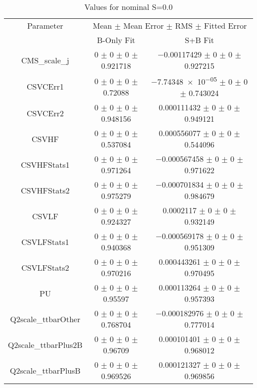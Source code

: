 \begin{table}
\centering
\caption{Values for nominal S=0.0}
\begin{tabular}{ccc}
\toprule
Parameter & \multicolumn{2}{c}{Mean $\pm$ Mean Error $\pm$ RMS $\pm$ Fitted Error}\\
 & B-Only Fit & S+B Fit\\
\midrule
CMS\_scale\_j & \num{0} $\pm$ \num{0} $\pm$ \num{0} $\pm$ \num{0.921718} & \num{-0.00117429} $\pm$ \num{0} $\pm$ \num{0} $\pm$ \num{0.927215}\\
CSVCErr1 & \num{0} $\pm$ \num{0} $\pm$ \num{0} $\pm$ \num{0.72088} & \num{-7.74348e-05} $\pm$ \num{0} $\pm$ \num{0} $\pm$ \num{0.743024}\\
CSVCErr2 & \num{0} $\pm$ \num{0} $\pm$ \num{0} $\pm$ \num{0.948156} & \num{0.000111432} $\pm$ \num{0} $\pm$ \num{0} $\pm$ \num{0.949121}\\
CSVHF & \num{0} $\pm$ \num{0} $\pm$ \num{0} $\pm$ \num{0.537084} & \num{0.000556077} $\pm$ \num{0} $\pm$ \num{0} $\pm$ \num{0.544096}\\
CSVHFStats1 & \num{0} $\pm$ \num{0} $\pm$ \num{0} $\pm$ \num{0.971264} & \num{-0.000567458} $\pm$ \num{0} $\pm$ \num{0} $\pm$ \num{0.971622}\\
CSVHFStats2 & \num{0} $\pm$ \num{0} $\pm$ \num{0} $\pm$ \num{0.975279} & \num{-0.000701834} $\pm$ \num{0} $\pm$ \num{0} $\pm$ \num{0.984679}\\
CSVLF & \num{0} $\pm$ \num{0} $\pm$ \num{0} $\pm$ \num{0.924327} & \num{0.0002117} $\pm$ \num{0} $\pm$ \num{0} $\pm$ \num{0.932149}\\
CSVLFStats1 & \num{0} $\pm$ \num{0} $\pm$ \num{0} $\pm$ \num{0.940368} & \num{-0.000569178} $\pm$ \num{0} $\pm$ \num{0} $\pm$ \num{0.951309}\\
CSVLFStats2 & \num{0} $\pm$ \num{0} $\pm$ \num{0} $\pm$ \num{0.970216} & \num{0.000443261} $\pm$ \num{0} $\pm$ \num{0} $\pm$ \num{0.970495}\\
PU & \num{0} $\pm$ \num{0} $\pm$ \num{0} $\pm$ \num{0.95597} & \num{0.000113264} $\pm$ \num{0} $\pm$ \num{0} $\pm$ \num{0.957393}\\
Q2scale\_ttbarOther & \num{0} $\pm$ \num{0} $\pm$ \num{0} $\pm$ \num{0.768704} & \num{-0.000182976} $\pm$ \num{0} $\pm$ \num{0} $\pm$ \num{0.777014}\\
Q2scale\_ttbarPlus2B & \num{0} $\pm$ \num{0} $\pm$ \num{0} $\pm$ \num{0.96709} & \num{0.000101401} $\pm$ \num{0} $\pm$ \num{0} $\pm$ \num{0.968012}\\
Q2scale\_ttbarPlusB & \num{0} $\pm$ \num{0} $\pm$ \num{0} $\pm$ \num{0.969526} & \num{0.000121327} $\pm$ \num{0} $\pm$ \num{0} $\pm$ \num{0.969856}\\

\end{tabular}
\end{table}
